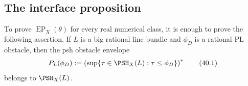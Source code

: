 \subsection{The interface proposition}
\label{sec:ch40-interface}

\begin{proposition}\label{prop:bj-smooth-obstacle-interface}
To prove $\operatorname{EP}_X(\theta)$ for every real numerical class, it
is enough to prove the following assertion.  If $L$ is a big rational
line bundle and $\phi_D$ is a rational PL obstacle, then the psh obstacle
envelope
\[
       P_L(\phi_D):=
       \left(\sup\{\tau\in\PSH_X(L):\tau\le\phi_D\}\right)^*
\tag{40.1}\label{eq:bj-smooth-obstacle-envelope-definition}
\]
belongs to $\PSH_X(L)$.
\end{proposition}

